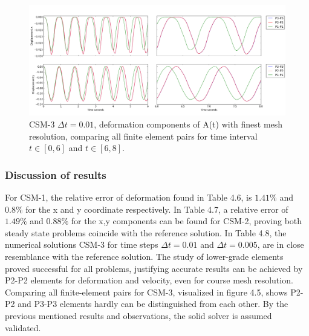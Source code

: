 \begin{figure}[h!]
  \centering
    \includegraphics[scale=0.34]{./Fig/csm3compare.png}
      \caption{CSM-3 $\Delta t = 0.01$, deformation components of A(t) with finest mesh resolution, comparing all finite element pairs for time interval $t \in [0, 6]$  and $t \in [6, 8]$.}
\end{figure}


\subsubsection*{Discussion of results}
 For CSM-1, the relative error of deformation found in Table 4.6, is $1.41 \%$ and $0.8\%$ for the x and y coordinate respectively. In Table 4.7, a relative error of   $1.49 \%$ and $0.88\%$ for the x,y components can be found for CSM-2, proving both steady state problems coincide with the reference solution. In Table 4.8, the numerical solutions CSM-3 for time steps $\Delta t = 0.01$ and $\Delta t = 0.005$, are in close resemblance with the reference solution. The study of lower-grade elements proved successful for all problems, justifying accurate results can be achieved by P2-P2 elements for deformation and velocity, even for course mesh resolution. Comparing all finite-element pairs for CSM-3, visualized in figure 4.5, shows P2-P2 and P3-P3 elements hardly can be distinguished from each other. By the previous mentioned results and observations, the solid solver is assumed validated.
 


\newpage
